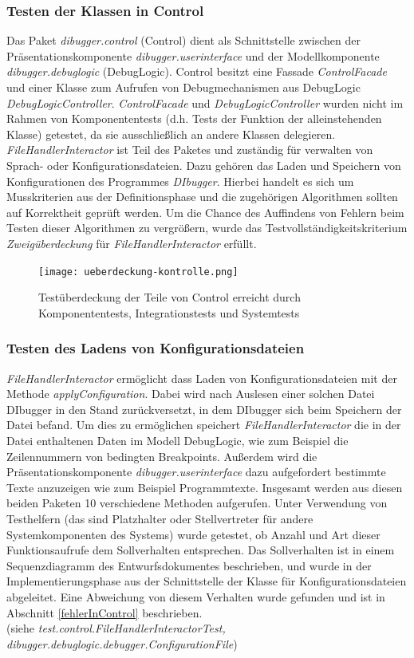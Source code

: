 \documentclass[parskip=full]{scrartcl}
\begin{document}
\subsubsection{Testen der Klassen in Control}
Das Paket \textit{dibugger.control} (Control) dient als Schnittstelle zwischen der Präsentationskomponente \textit{dibugger.userinterface} und der Modellkomponente \textit{dibugger.debuglogic} (DebugLogic).
Control besitzt eine Fassade \textit{ControlFacade} und einer Klasse zum Aufrufen von Debugmechanismen aus DebugLogic \textit{DebugLogicController}.
\textit{ControlFacade} und \textit{DebugLogicController} wurden nicht im Rahmen von Komponententests (d.h. Tests der Funktion der alleinstehenden Klasse) getestet, da sie ausschließlich an andere Klassen delegieren.\\
\textit{FileHandlerInteractor} ist Teil des Paketes und zuständig für verwalten von Sprach- oder Konfigurationsdateien.
Dazu gehören das Laden und Speichern von Konfigurationen des Programmes \textit{DIbugger}.
Hierbei handelt es sich um Musskriterien aus der Definitionsphase und die zugehörigen Algorithmen sollten auf Korrektheit geprüft werden.
Um die Chance des Auffindens von Fehlern beim Testen dieser Algorithmen zu vergrößern, wurde das Testvollständigkeitskriterium \textit{Zweigüberdeckung} für \textit{FileHandlerInteractor} erfüllt.

\begin{figure}[!h]
    \centering
    \texttt{[image: ueberdeckung-kontrolle.png]}
    \caption{Testüberdeckung der Teile von Control erreicht durch Komponententests, Integrationstests und Systemtests}
\end{figure}

\subsubsection{Testen des Ladens von Konfigurationsdateien}
\textit{FileHandlerInteractor} ermöglicht dass Laden von Konfigurationsdateien mit der Methode \textit{applyConfiguration}.
Dabei wird nach Auslesen einer solchen Datei DIbugger in den Stand zurückversetzt, in dem DIbugger sich beim Speichern der Datei befand.
Um dies zu ermöglichen speichert \textit{FileHandlerInteractor} die in der Datei enthaltenen Daten im Modell DebugLogic, wie zum Beispiel die Zeilennummern von bedingten Breakpoints.
Außerdem wird die Präsentationskomponente \textit{dibugger.userinterface} dazu aufgefordert bestimmte Texte anzuzeigen wie zum Beispiel Programmtexte.
Insgesamt werden aus diesen beiden Paketen 10 verschiedene Methoden aufgerufen.
Unter Verwendung von Testhelfern (das sind Platzhalter oder Stellvertreter für andere Systemkomponenten des Systems) wurde getestet, ob Anzahl und Art dieser Funktionsaufrufe dem Sollverhalten entsprechen.
Das Sollverhalten ist in einem Sequenzdiagramm des Entwurfsdokumentes beschrieben, und wurde in der Implementierungsphase aus der Schnittstelle der Klasse für Konfigurationsdateien abgeleitet.
Eine Abweichung von diesem Verhalten wurde gefunden und ist in Abschnitt \ref{fehlerInControl} beschrieben.\\
(siehe \textit{test.control.FileHandlerInteractorTest, dibugger.debuglogic.debugger.ConfigurationFile})
\end{document}
